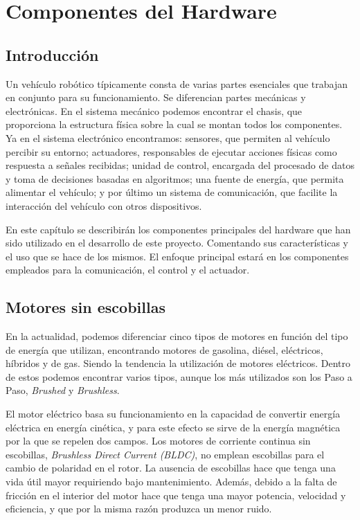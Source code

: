 \chapter{Componentes del Hardware}

\thispagestyle{plain}
\renewcommand{\tablename}{Tabla}

\section{Introducción}

Un vehículo robótico típicamente consta de varias partes esenciales que trabajan en conjunto para su funcionamiento. Se diferencian partes mecánicas y electrónicas. En el sistema mecánico podemos encontrar el chasis, que proporciona la estructura física sobre la cual se montan todos los componentes. Ya en el sistema electrónico encontramos: sensores, que permiten al vehículo percibir su entorno; actuadores, responsables de ejecutar acciones físicas como respuesta a señales recibidas; unidad de control, encargada del procesado de datos y toma de decisiones basadas en algoritmos; una fuente de energía, que permita alimentar el vehículo; y por último un sistema de comunicación, que facilite la interacción del vehículo con otros dispositivos.

En este capítulo se describirán los componentes principales del hardware que han sido utilizado en el desarrollo de este proyecto. Comentando sus características y el uso que se hace de los mismos. El enfoque principal estará en los componentes empleados para la comunicación, el control y el actuador.

\section{Motores sin escobillas}
En la actualidad, podemos diferenciar cinco tipos de motores en función del tipo de energía que utilizan, encontrando motores de gasolina, diésel, eléctricos, híbridos y de gas. Siendo la tendencia la utilización de motores eléctricos. Dentro de estos podemos encontrar varios tipos, aunque los más utilizados son los Paso a Paso, \textit{Brushed} y \textit{Brushless}. 

El motor eléctrico basa su funcionamiento en la capacidad de convertir energía eléctrica en energía cinética, y para este efecto se sirve de la energía magnética por la que se repelen dos campos. Los motores de corriente continua sin escobillas, \textit{Brushless Direct Current (BLDC)}, no emplean escobillas para el cambio de polaridad en el rotor. La ausencia de escobillas hace que tenga una vida útil mayor requiriendo bajo mantenimiento. Además, debido a la falta de fricción en el interior del motor hace que tenga una mayor potencia, velocidad y eficiencia, y que por la misma razón produzca un menor ruido. 

